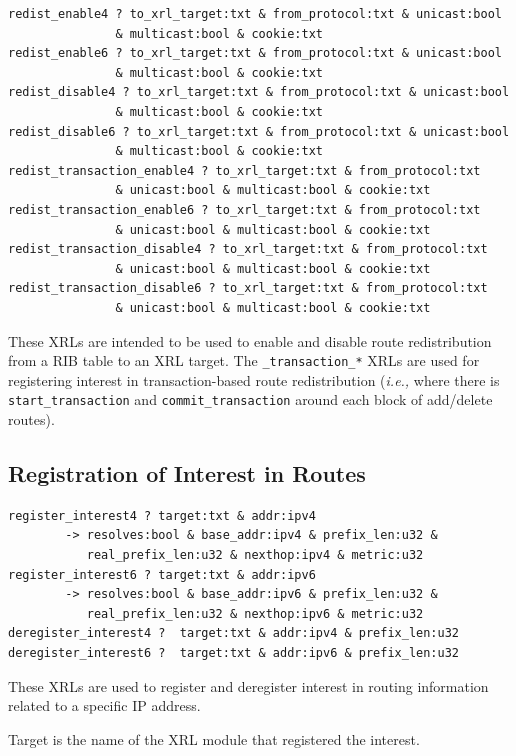 \documentclass[11pt]{article}
\newcommand{\ie}{\emph{i.e.,}\xspace}
\begin{document}
\begin{verbatim}
redist_enable4 ? to_xrl_target:txt & from_protocol:txt & unicast:bool
               & multicast:bool & cookie:txt
redist_enable6 ? to_xrl_target:txt & from_protocol:txt & unicast:bool
               & multicast:bool & cookie:txt
redist_disable4 ? to_xrl_target:txt & from_protocol:txt & unicast:bool
               & multicast:bool & cookie:txt
redist_disable6 ? to_xrl_target:txt & from_protocol:txt & unicast:bool
               & multicast:bool & cookie:txt
redist_transaction_enable4 ? to_xrl_target:txt & from_protocol:txt
               & unicast:bool & multicast:bool & cookie:txt
redist_transaction_enable6 ? to_xrl_target:txt & from_protocol:txt
               & unicast:bool & multicast:bool & cookie:txt
redist_transaction_disable4 ? to_xrl_target:txt & from_protocol:txt
               & unicast:bool & multicast:bool & cookie:txt
redist_transaction_disable6 ? to_xrl_target:txt & from_protocol:txt
               & unicast:bool & multicast:bool & cookie:txt
\end{verbatim}

These XRLs are intended to be used to enable and disable route
redistribution from a RIB table to an XRL target.
The {\tt *\_transaction\_*} XRLs are used for registering interest in
transaction-based route redistribution (\ie where there is
{\tt start\_transaction} and {\tt commit\_transaction} around each block
of add/delete routes).

\subsection{Registration of Interest in Routes}
\label{reg}

\begin{verbatim}
register_interest4 ? target:txt & addr:ipv4 
        -> resolves:bool & base_addr:ipv4 & prefix_len:u32 & 
           real_prefix_len:u32 & nexthop:ipv4 & metric:u32
register_interest6 ? target:txt & addr:ipv6 
        -> resolves:bool & base_addr:ipv6 & prefix_len:u32 & 
           real_prefix_len:u32 & nexthop:ipv6 & metric:u32
deregister_interest4 ?  target:txt & addr:ipv4 & prefix_len:u32
deregister_interest6 ?  target:txt & addr:ipv6 & prefix_len:u32
\end{verbatim}

These XRLs are used to register and deregister interest in routing
information related to a specific IP address. 

Target is the name of the XRL module that registered the interest.
\end{document}
